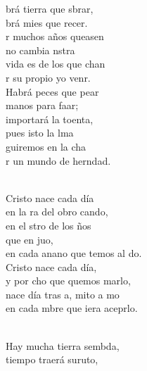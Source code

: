 \documentclass[12pt]{article}
\begin{document}
\begin{multicols*}{2}
\begin{cancion}%
	brá tierra que sbrar,\\
	brá mies que recer.\\
	r muchos años queasen\\
	no cambia nstra \\
	 vida es de los que chan\\
	r su propio yo venr.\\
\jump
	Habrá peces que pear\\
	manos para faar;\\
	 importará la toenta,\\
	pues isto la lma\\
	guiremos en la cha\\
	r un mundo de herndad. \\\jump\\
	\begin{chorus}%
Cristo nace cada día\\
	en la ra del obro cando,\\
	en el stro de los ños\\
	que en juo, \\
	en cada anano que temos al do.\\
Cristo nace cada día,\\
	y por cho que quemos marlo,\\
	nace día tras a, mito a mo  \\
	en cada mbre que iera aceprlo.\\
	\end{chorus}%
	\jump\\
	Hay mucha tierra sembda,\\
	 tiempo traerá suruto,\\

\end{cancion}
\end{multicols*}
\end{document}
